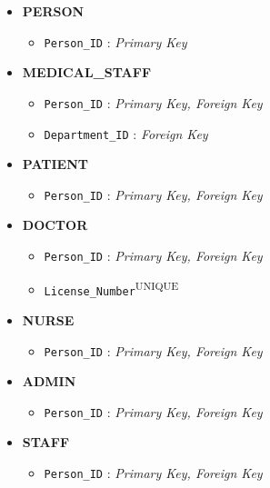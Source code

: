 \documentclass[12pt,a4paper]{article}
\begin{document}
\begin{itemize}[label=\textbf{--}]

	\item \textbf{PERSON}
	      \begin{itemize}[label=$\bullet$]
		      \item \texttt{Person\_ID} : \textit{Primary Key}
	      \end{itemize}

	\item \textbf{MEDICAL\_STAFF}
	      \begin{itemize}[label=$\bullet$]
		      \item \texttt{Person\_ID} : \textit{Primary Key, Foreign Key}
		      \item \texttt{Department\_ID} : \textit{Foreign Key}
	      \end{itemize}

	\item \textbf{PATIENT}
	      \begin{itemize}[label=$\bullet$]
		      \item \texttt{Person\_ID} : \textit{Primary Key, Foreign Key}
	      \end{itemize}

	\item \textbf{DOCTOR}
	      \begin{itemize}[label=$\bullet$]
		      \item \texttt{Person\_ID} : \textit{Primary Key, Foreign Key}
		      \item \texttt{License\_Number}\textsuperscript{UNIQUE}
	      \end{itemize}

	\item \textbf{NURSE}
	      \begin{itemize}[label=$\bullet$]
		      \item \texttt{Person\_ID} : \textit{Primary Key, Foreign Key}
	      \end{itemize}

	\item \textbf{ADMIN}
	      \begin{itemize}[label=$\bullet$]
		      \item \texttt{Person\_ID} : \textit{Primary Key, Foreign Key}
	      \end{itemize}

	\item \textbf{STAFF}
	      \begin{itemize}[label=$\bullet$]
		      \item \texttt{Person\_ID} : \textit{Primary Key, Foreign Key}
	      \end{itemize}


\end{itemize}
\end{document}
